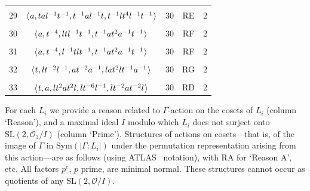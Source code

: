 \documentclass[11pt]{amsart}
\theoremstyle{definition}
\theoremstyle{remark}
\newcommand{\SL}{\mathrm{SL}}
\begin{document}
\begin{table}[h!]
\begin{center}
\begin{tabular}{|c|c|c|c|c|}
\vspace{-12pt} & & & &   \\
29& $\langle \hspace{.75pt} a, tal^{-1}t^{-1}, 
t^{-1}al^{-1}t, t^{-1}lt^4l^{-1}t^{-1} \hspace{.75pt}\rangle$&30& RE&
$2$ \\
\vspace{-12pt} & & & &   \\
30& $\langle \hspace{.75pt} a, t^{-4}, ltl^{-1}t^{-1}, 
t^{-1}at^2a^{-1}t^{-1} \hspace{.75pt}\rangle$&30& RF& $2$ \\
\vspace{-12pt} & & & &   \\
31& $\langle \hspace{.75pt} a, t^{-4}, l^{-1}tlt^{-1},
t^{-1}at^2a^{-1}t^{-1} \hspace{.75pt}\rangle$&30& RF& $2$ \\
\vspace{-12pt} & & & &   \\
32& $\langle \hspace{.75pt} t, lt^{-2}l^{-1}, at^{-2}a^{-1},
 lat^2lt^{-1}a^{-1} \hspace{.75pt}\rangle$&30& RG& $2$
\\
\vspace{-12pt} & & & &   \\
33& $\langle \hspace{.75pt} t, a, lt^2at^2l, lt^{-6}l^{-1}, 
lt^{-2}at^{-2}l \hspace{.75pt}\rangle$&30& RD& $2$ \\
            \hline
    \end{tabular}
  \end{center}
\end{table}


For each $L_i$ we provide a reason related 
to $\Gamma$-action on the cosets of $L_i$ (column `Reason'), and 
a maximal ideal $I$ modulo which $L_i$ does not surject
onto  $\SL(2,\mathcal{O}_3/I)$ (column `Prime').
Structures of actions on cosets---that is, of the image of $\Gamma$
in $\mathrm{Sym}(|\Gamma:L_i|)$ under the permutation representation
arising from this action---are as follows (using
ATLAS~\cite{ATLAS} notation), with RA for `Reason A', etc. 
All factors $p^e$, $p$ prime, are minimal normal.
These structures cannot occur as quotients of any 
$\SL(2,\mathcal{O}/I)$. 

\medskip
\end{document}
